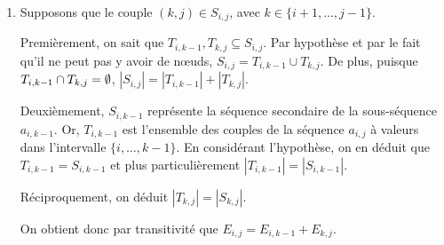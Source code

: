 \documentclass[12pt,a4paper]{article}
\begin{document}
\begin{enumerate}
	D'abord, on sait que $T_{i+1,j-1} \subseteq S_{i,j}$. Par hypoth\`ese, \( S_{i,j} = \{(i,j)\} \cup T_{i+1,j-1} \). De plus, puisque \( \{ (i,j) \} \cap T_{i+1,j-1} = \emptyset \), \( |S_{i,j}| = 1 + |T_{i+1,j-1}| \).
	
	Par ailleurs, $S_{i+1,j-1}$ repr\'esente la s\'equence secondaire de la sous-s\'equence $a_{i+1,j-1}$. Or, \( T_{i+1,j-1} \) est l'ensemble des couples de la s\'equence $a_{i,j}$ \`a valeurs dans l'intervalle $\{i+1,\dotsc,j-1\}$. En consid\'erant l'hypoth\`ese, on en d\'eduit que $T_{i+1,j-1} = S_{i+1,j-1}$ et plus particuli\`erement $|T_{i+1,j-1}| = |S_{i+1,j-1}|$.
	
	On obtient donc par transitivit\'e que $E_{i,j} = 1+E_{i+1,j-1}$.
	
	\item Supposons que le couple \( (k,j) \in S_{i,j} \), avec \( k \in \{ i+1, \dotsc, j-1 \} \).
	
	Premi\`erement, on sait que $T_{i,k-1},T_{k,j} \subseteq S_{i,j}$. Par hypoth\`ese et par le fait qu'il ne peut pas y avoir de n\oe uds, $S_{i,j} = T_{i,k-1} \cup T_{k,j}$. De plus, puisque \( \\T_{i,k-1} \cap T_{k,j} = \emptyset \), \( |S_{i,j}| = |T_{i,k-1}| + |T_{k,j}| \).
	
	Deuxi\`emement, $S_{i,k-1}$ repr\'esente la s\'equence secondaire de la sous-s\'equence $a_{i,k-1}$. Or, \( T_{i,k-1} \) est l'ensemble des couples de la s\'equence $a_{i,j}$ \`a valeurs dans l'intervalle $\{i,\dotsc,k-1\}$. En consid\'erant l'hypoth\`ese, on en d\'eduit que $T_{i,k-1} = S_{i,k-1}$ et plus particuli\`erement $|T_{i,k-1}| = |S_{i,k-1}|$. 
	
	R\'eciproquement, on d\'eduit $|T_{k,j}| = |S_{k,j}|$.
	
	On obtient donc par transitivit\'e que \( E_{i,j} = E_{i,k-1} + E_{k,j} \).
\end{enumerate}
\end{document}
